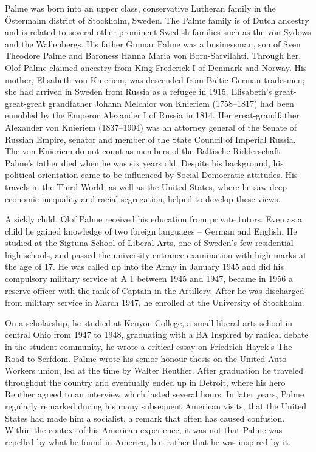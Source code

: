 Palme was born into an upper class, conservative Lutheran family in the
Östermalm district of Stockholm, Sweden. The Palme family is of Dutch
ancestry and is related to several other prominent Swedish families such
as the von Sydows and the Wallenbergs. His father Gunnar Palme was a
businessman, son of Sven Theodore Palme and Baroness Hanna Maria von
Born-Sarvilahti. Through her, Olof Palme claimed ancestry from King
Frederick I of Denmark and Norway. His mother, Elisabeth von Knieriem,
was descended from Baltic German tradesmen; she had arrived in Sweden
from Russia as a refugee in 1915. Elisabeth's great-great-great
grandfather Johann Melchior von Knieriem (1758--1817) had been ennobled
by the Emperor Alexander I of Russia in 1814. Her great-grandfather
Alexander von Knieriem (1837--1904) was an attorney general of the
Senate of Russian Empire, senator and member of the State Council of
Imperial Russia. The von Knieriem do not count as members of the
Baltische Ridderschaft. Palme's father died when he was six years old.
Despite his background, his political orientation came to be influenced
by Social Democratic attitudes. His travels in the Third World, as well
as the United States, where he saw deep economic inequality and racial
segregation, helped to develop these views.

A sickly child, Olof Palme received his education from private tutors.
Even as a child he gained knowledge of two foreign languages -- German
and English. He studied at the Sigtuna School of Liberal Arts, one of
Sweden's few residential high schools, and passed the university
entrance examination with high marks at the age of 17. He was called up
into the Army in January 1945 and did his compulsory military service at
A 1 between 1945 and 1947, became in 1956 a reserve officer with the
rank of Captain in the Artillery. After he was discharged from military
service in March 1947, he enrolled at the University of Stockholm.

On a scholarship, he studied at Kenyon College, a small liberal arts
school in central Ohio from 1947 to 1948, graduating with a BA Inspired
by radical debate in the student community, he wrote a critical essay on
Friedrich Hayek's The Road to Serfdom. Palme wrote his senior honour
thesis on the United Auto Workers union, led at the time by Walter
Reuther. After graduation he traveled throughout the country and
eventually ended up in Detroit, where his hero Reuther agreed to an
interview which lasted several hours. In later years, Palme regularly
remarked during his many subsequent American visits, that the United
States had made him a socialist, a remark that often has caused
confusion. Within the context of his American experience, it was not
that Palme was repelled by what he found in America, but rather that he
was inspired by it.

